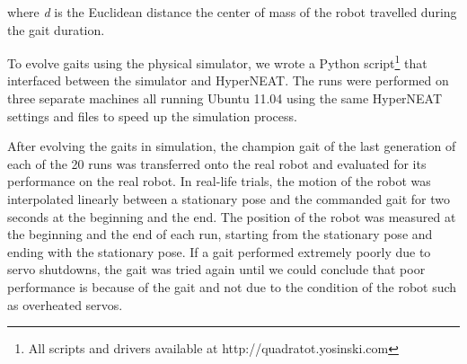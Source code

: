 where \emph{d} is the Euclidean distance the center of mass of the robot travelled during the gait duration. %



To evolve gaits using the physical simulator, we wrote a Python script\footnote{All scripts and drivers available at http://quadratot.yosinski.com} that interfaced between the simulator and HyperNEAT. %
The runs were performed on three separate machines all running Ubuntu 11.04 using the same HyperNEAT settings and files to speed up the simulation process.


After evolving the gaits in simulation, the champion gait of the last generation of each of the 20 runs was transferred onto the real robot and evaluated for its performance on the real robot.
In real-life trials, the motion of the robot was interpolated linearly between a stationary pose and the commanded gait for two seconds at the beginning and the end. 
The position of the robot was measured at the beginning and the end of each run, starting from the stationary pose and ending with the stationary pose. 
If a gait performed extremely poorly due to servo shutdowns, the gait was tried again until we could conclude that poor performance is because of the gait and not due to the condition of the robot such as overheated servos.

